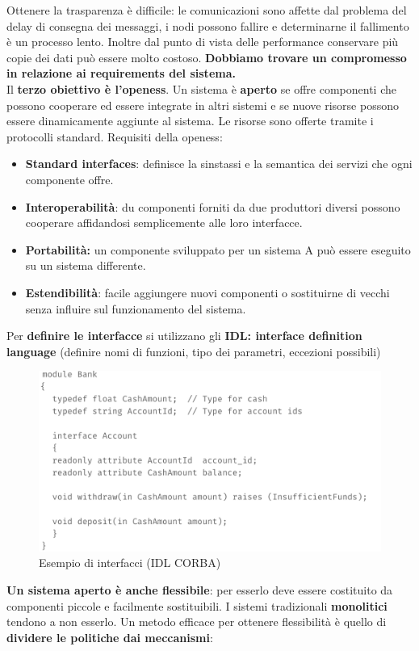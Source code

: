 \documentclass[12pt]{article}
\begin{document}
		Ottenere la trasparenza è difficile: le comunicazioni sono affette dal problema del delay di consegna dei messaggi, i nodi possono fallire e determinarne il fallimento è un processo lento. Inoltre dal punto di vista delle performance conservare più copie dei dati può essere molto costoso. \textbf{Dobbiamo trovare un compromesso in relazione ai requirements del sistema.}\\
		Il \textbf{terzo obiettivo è l'openess}.
		Un sistema è \textbf{aperto} se offre componenti che possono cooperare ed essere integrate in altri sistemi e se nuove risorse possono essere dinamicamente aggiunte al sistema. Le risorse sono offerte tramite i protocolli standard. Requisiti della openess: 
		\begin{itemize}
			\item \textbf{Standard interfaces}:  definisce la sinstassi e la semantica dei servizi che ogni componente offre.
			\item \textbf{Interoperabilità}: du componenti forniti da due produttori diversi possono cooperare affidandosi semplicemente alle loro interfacce.
			\item \textbf{Portabilità:} un componente sviluppato per un sistema A può essere eseguito su un sistema differente.
			\item \textbf{Estendibilità}: facile aggiungere nuovi componenti o sostituirne di vecchi senza influire sul funzionamento del sistema.
		\end{itemize}
		Per \textbf{definire le interfacce } si utilizzano gli \textbf{IDL: interface definition language} (definire nomi di funzioni, tipo dei parametri, eccezioni possibili)
		\begin{figure}[h!]
			\centering
			\includegraphics[scale=0.30]{img/idl0.png}
			\caption{Esempio di interfacci (IDL CORBA)}
		\end{figure}
		\textbf{Un sistema aperto è anche flessibile}: per esserlo deve essere costituito da componenti piccole e facilmente sostituibili. I sistemi tradizionali \textbf{monolitici} tendono a non esserlo. Un metodo efficace per ottenere flessibilità è quello di \textbf{dividere le politiche dai meccanismi}:
\end{document}
